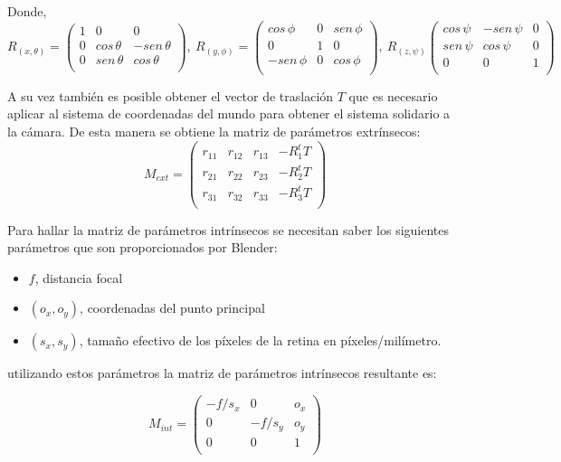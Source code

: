  Donde,
 \[R_{(x,\theta)} = \begin{pmatrix}
		1 &   0         &  0\\
		0 & cos\,\theta & -sen\,\theta\\
		0 & sen\,\theta & cos\,\theta\\ 
\end{pmatrix}, ~
R_{(y,\phi)}=\begin{pmatrix}
		cos\,\phi  & 0 & sen\,\phi\\
		0          & 1 & 0\\
		-sen\,\phi &0  & cos\,\phi\\ 
\end{pmatrix}, ~
R_{(z,\psi)}\begin{pmatrix}
		cos\,\psi & -sen\,\psi & 0\\
		sen\,\psi & cos\,\psi  & 0\\
		 0          & 0            & 1\\ 
\end{pmatrix}\]

A su vez también es posible obtener el vector de traslación $T$ que es necesario aplicar al sistema de coordenadas del mundo para obtener el sistema solidario a la cámara. De esta manera se obtiene la matriz de parámetros extrínsecos:
\[
		M_{ext}=\begin{pmatrix}
			r_{11} & r_{12} & r_{13} &-R^t_1 T\\
			r_{21} & r_{22} & r_{23} &-R^t_2 T\\
			r_{31} & r_{32} & r_{33} &-R^t_3 T\\
		\end{pmatrix}
\] 

Para hallar la matriz de parámetros intrínsecos se necesitan saber los siguientes parámetros que son proporcionados por Blender: 
\begin{itemize}
\item $f$, distancia focal
\item $(o_x, o_y)$, coordenadas del punto principal
\item $(s_x,s_y)$, tamaño efectivo de los píxeles de la retina en píxeles/milímetro.
\end{itemize}

utilizando estos parámetros la matriz de parámetros intrínsecos resultante es:

\[M_{int}=\begin{pmatrix}
			-f/s_x & 0      & o_x\\
			0      & -f/s_y & o_y\\
			0      & 0      & 1\\
		\end{pmatrix} \]
 
